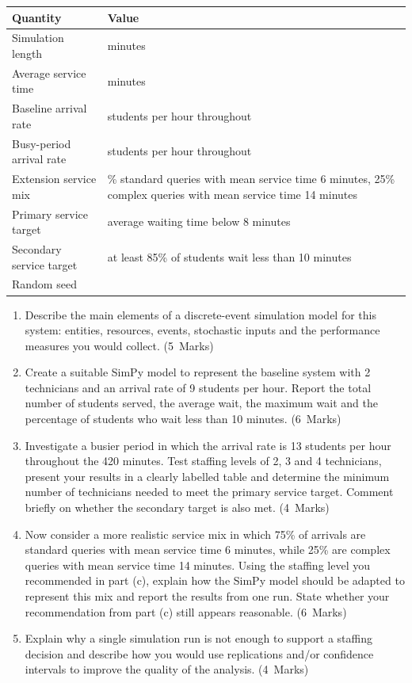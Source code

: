 \documentclass[11pt,a4paper]{article}
\newcommand{\markalloc}[1]{\nobreak\hfill\mbox{(#1 Marks)}}
\begin{document}
\begin{center}
\begin{tabularx}{0.92\textwidth}{>{\raggedright\arraybackslash}X>{\raggedleft\arraybackslash}p{6.2cm}}
\toprule
Quantity & Value \\
\midrule
Simulation length & 420 minutes \\
Average service time & 8 minutes \\
Baseline arrival rate & 9 students per hour throughout \\
Busy-period arrival rate & 13 students per hour throughout \\
Extension service mix & 75\% standard queries with mean service time 6 minutes, 25\% complex queries with mean service time 14 minutes \\
Primary service target & average waiting time below 8 minutes \\
Secondary service target & at least 85\% of students wait less than 10 minutes \\
Random seed & 42 \\
\bottomrule
\end{tabularx}
\end{center}

\begin{enumerate}
\item Describe the main elements of a discrete-event simulation model for this system:
entities, resources, events, stochastic inputs and the performance measures you would collect. \markalloc{5}

\item Create a suitable SimPy model to represent the baseline system with 2 technicians and an arrival rate of 9 students per hour.
Report the total number of students served, the average wait, the maximum wait and the percentage of students who wait less than 10 minutes. \markalloc{6}

\item Investigate a busier period in which the arrival rate is 13 students per hour throughout the 420 minutes.
Test staffing levels of 2, 3 and 4 technicians, present your results in a clearly labelled table and determine the minimum number of technicians needed to meet the primary service target. Comment briefly on whether the secondary target is also met. \markalloc{4}

\item Now consider a more realistic service mix in which 75\% of arrivals are standard queries with mean service time 6 minutes, while 25\% are complex queries with mean service time 14 minutes.
Using the staffing level you recommended in part (c), explain how the SimPy model should be adapted to represent this mix and report the results from one run. State whether your recommendation from part (c) still appears reasonable. \markalloc{6}

\item Explain why a single simulation run is not enough to support a staffing decision and describe how you would use replications and/or confidence intervals to improve the quality of the analysis. \markalloc{4}
\end{enumerate}
\end{document}
